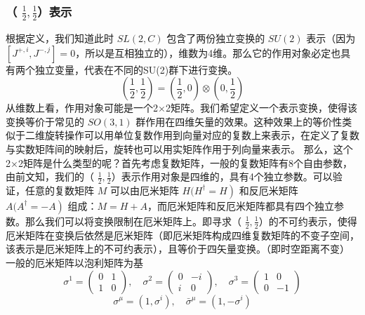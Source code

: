 \subsubsection{（ $\frac{1}{2},\frac{1}{2}$）表示}
根据定义，我们知道此时 $SL(2,C)$ 包含了两份独立变换的 $SU(2)$ 表示（因为 $[J^{+, i}, J^{-, j}]=0$，所以是互相独立的），维数为4维。那么它的作用对象必定也具有两个独立变量，代表在不同的SU(2)群下进行变换。
\begin{equation}
\left(\frac{1}{2}, \frac{1}{2}\right)=\left(\frac{1}{2}, 0\right) \otimes\left(0, \frac{1}{2}\right)
\end{equation}
从维数上看，作用对象可能是一个2×2矩阵。我们希望定义一个表示变换，使得该变换等价于常见的 $SO(3,1)$ 群作用在四维矢量的效果。这种效果上的等价性类似于二维旋转操作可以用单位复数作用到向量对应的复数上来表示，在定义了复数与实数矩阵间的映射后，旋转也可以用实矩阵作用于列向量来表示。
那么，这个2×2矩阵是什么类型的呢？首先考虑复数矩阵，一般的复数矩阵有8个自由参数，由前文知，我们的（ $\frac{1}{2},\frac{1}{2}$）表示作用对象是四维的，具有4个独立参数。可以验证，任意的复数矩阵 $M$ 可以由厄米矩阵 $H(\left.H^{\dagger}=H\right)$ 和反厄米矩阵 $A(\left.A^{\dagger}=-A\right)$ 组成：$M=H+A$，而厄米矩阵和反厄米矩阵都具有四个独立参数。那么我们可以将变换限制在厄米矩阵上。即寻求（ $\frac{1}{2},\frac{1}{2}$）的不可约表示，使得厄米矩阵在变换后依然是厄米矩阵（即厄米矩阵构成四维复数矩阵的不变子空间，该表示是厄米矩阵上的不可约表示），且等价于四矢量变换。（即时空距离不变）
一般的厄米矩阵以泡利矩阵为基
\begin{equation}
\sigma^{1}=\left(\begin{array}{ll}
0 & 1 \\
1 & 0
\end{array}\right), \quad \sigma^{2}=\left(\begin{array}{cc}
0 & -i \\
i & 0
\end{array}\right), \quad \sigma^{3}=\left(\begin{array}{cc}
1 & 0 \\
0 & -1
\end{array}\right)
\end{equation}
\begin{equation}
\sigma^{\mu}=\left(1, \sigma^{i}\right), \quad \bar{\sigma}^{\mu}=\left(1,-\sigma^{i}\right)
\end{equation}
